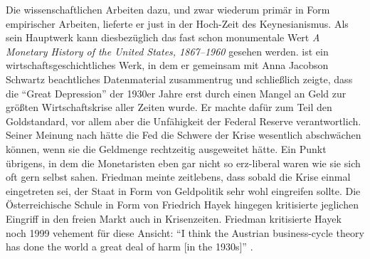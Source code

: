 Die wissenschaftlichen Arbeiten dazu, und zwar wiederum primär in Form empirischer Arbeiten, lieferte er just in der Hoch-Zeit des Keynesianismus. Als sein Hauptwerk kann diesbezüglich das fast schon monumentale Wert \textit{A Monetary History of the United States, 1867–1960} gesehen werden. \textcite{Friedman1963} ist ein wirtschaftsgeschichtliches Werk, in dem er gemeinsam mit Anna Jacobson Schwartz beachtliches Datenmaterial zusammentrug und schließlich zeigte, dass die "`Great Depression"' der 1930er Jahre erst durch einen Mangel an Geld zur größten Wirtschaftskrise aller Zeiten wurde. Er machte dafür zum Teil den Goldstandard, vor allem aber die Unfähigkeit der Federal Reserve verantwortlich. Seiner Meinung nach hätte die Fed die Schwere der Krise wesentlich abschwächen können, wenn sie die Geldmenge rechtzeitig ausgeweitet hätte. Ein Punkt übrigens, in dem die Monetaristen eben gar nicht so erz-liberal waren wie sie sich oft gern selbst sahen. Friedman meinte zeitlebens, dass sobald die Krise einmal eingetreten sei, der Staat in Form von Geldpolitik sehr wohl eingreifen sollte. Die Österreichische Schule in Form von Friedrich Hayek hingegen kritisierte jeglichen Eingriff in den freien Markt auch in Krisenzeiten. Friedman kritisierte Hayek noch 1999 vehement für diese Ansicht: "`I think the Austrian business-cycle theory has done the world a great deal of harm [in the 1930s]"' \parencite{Epstein1999}.

